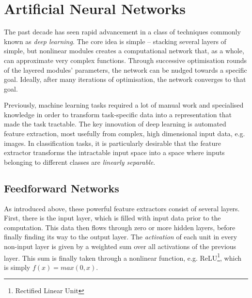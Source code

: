\documentclass[../../report.tex]{subfiles}
\begin{document}
\section{Artificial Neural Networks}

The past decade has seen rapid advancement in a class of techniques commonly
known as \emph{deep learning}. The core idea is simple -- stacking several
layers of simple, but nonlinear modules creates a computational network that, as
a whole, can approximate very complex functions. Through successive optimisation
rounds of the layered modules' parameters, the network can be nudged towards a
specific goal. Ideally, after many iterations of optimisation, the network
converges to that goal.

Previously, machine learning tasks required a lot of manual work and specialised
knowledge in order to transform task-specific data into a representation that
made the task tractable. The key innovation of deep learning is automated
feature extraction, most usefully from complex, high dimensional input data,
e.g. images. In classification tasks, it is particularly desirable that the
feature extractor transforms the intractable input space into a space where
inputs belonging to different classes are \emph{linearly separable}.
\cite{LeCun2015}


\subsection{Feedforward Networks}

As introduced above, these powerful feature extractors consist of several
layers. First, there is the input layer, which is filled with input data prior
to the computation. This data then flows through zero or more hidden layers,
before finally finding its way to the output layer. The \emph{activation} of
each unit in every non-input layer is given by a weighted sum over all
activations of the previous layer. This sum is finally taken through a nonlinear
function, e.g. ReLU\footnote{Rectified Linear Unit}, which is simply $f(x) =
max(0, x)$.

\end{document}
